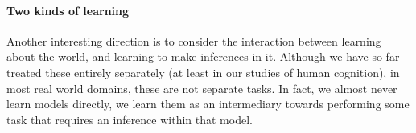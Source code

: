 
\paragraph{Two kinds of learning}

Another interesting direction is to consider the interaction between learning about the world, and learning to make inferences in it. Although we have so far treated these entirely separately (at least in our studies of human cognition), in most real world domains, these are not separate tasks. In fact, we almost never learn models directly, we learn them as an intermediary towards performing some task that requires an inference within that model. 


